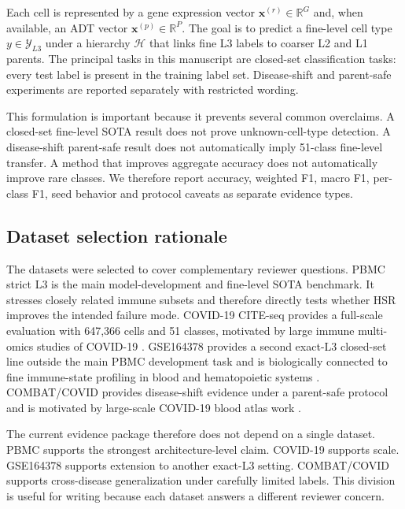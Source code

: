 \documentclass[unnumsec,webpdf,contemporary,large,numbered]{oup-authoring-template}
\begin{document}
Each cell is represented by a gene expression vector $\mathbf{x}^{(r)} \in \mathbb{R}^{G}$ and, when available, an ADT vector $\mathbf{x}^{(p)} \in \mathbb{R}^{P}$. The goal is to predict a fine-level cell type $y \in \mathcal{Y}_{L3}$ under a hierarchy $\mathcal{H}$ that links fine L3 labels to coarser L2 and L1 parents. The principal tasks in this manuscript are closed-set classification tasks: every test label is present in the training label set. Disease-shift and parent-safe experiments are reported separately with restricted wording.

This formulation is important because it prevents several common overclaims. A closed-set fine-level SOTA result does not prove unknown-cell-type detection. A disease-shift parent-safe result does not automatically imply 51-class fine-level transfer. A method that improves aggregate accuracy does not automatically improve rare classes. We therefore report accuracy, weighted F1, macro F1, per-class F1, seed behavior and protocol caveats as separate evidence types.

\subsection{Dataset selection rationale}

The datasets were selected to cover complementary reviewer questions. PBMC strict L3 is the main model-development and fine-level SOTA benchmark. It stresses closely related immune subsets and therefore directly tests whether HSR improves the intended failure mode. COVID-19 CITE-seq provides a full-scale evaluation with 647,366 cells and 51 classes, motivated by large immune multi-omics studies of COVID-19 \citep{stephenson2021}. GSE164378 provides a second exact-L3 closed-set line outside the main PBMC development task and is biologically connected to fine immune-state profiling in blood and hematopoietic systems \citep{villani2017,triana2021}. COMBAT/COVID provides disease-shift evidence under a parent-safe protocol and is motivated by large-scale COVID-19 blood atlas work \citep{combat2022}.

The current evidence package therefore does not depend on a single dataset. PBMC supports the strongest architecture-level claim. COVID-19 supports scale. GSE164378 supports extension to another exact-L3 setting. COMBAT/COVID supports cross-disease generalization under carefully limited labels. This division is useful for writing because each dataset answers a different reviewer concern.
\end{document}
